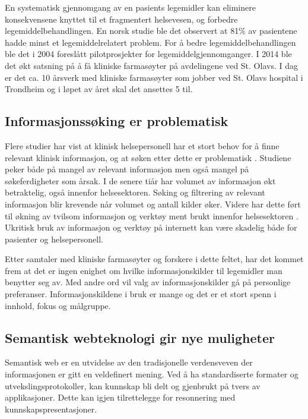 En systematisk gjennomgang av en pasients legemidler kan eliminere konsekvensene knyttet til et fragmentert helsevesen, og forbedre legemiddelbehandlingen. En norsk studie ble det observert at 81\% av pasientene hadde minst et legemiddelrelatert problem.\citep{81prosent_LRP} For å bedre legemiddelbehandlingen ble det i 2004 foreslått pilotprosjekter for legemiddelgjennomganger. \citep{Helsedirektoratet_veileder_LMG} I 2014 ble det økt satsning på å få kliniske farmasøyter på avdelingene ved St. Olavs. I dag er det ca. 10 årsverk med kliniske farmasøyter som jobber ved St. Olavs hospital i Trondheim og i løpet av året skal det ansettes 5 til.


\subsection{Informasjonssøking er problematisk}
Flere studier har vist at klinisk helsepersonell har et stort behov for å finne relevant klinisk informasjon, og at søken etter dette er problematisk \citep{Information_Needs_Information_Seeking_PHC}\citep{Information_Needs_Being_Met}\citep{IR_Patterns_Surgeons}. Studiene peker både på mangel av relevant informasjon men også mangel på søkeferdigheter som årsak. I de senere tiår har volumet av informasjon økt betraktelig, også innenfor helsesektoren. Søking og filtrering av relevant informasjon blir krevende når volumet og antall kilder øker. Videre har dette ført til økning av tvilsom informasjon og verktøy ment brukt innenfor helsesektoren \citep{Rating_Health_Information}. Ukritisk bruk av informasjon og verktøy på internett kan være skadelig både for pasienter og helsepersonell. 

Etter samtaler med kliniske farmasøyter og forskere i dette feltet, har det kommet frem at det er ingen enighet om hvilke informasjonskilder til legemidler man benytter seg av. Med andre ord vil valg av informasjonskilder gå på personlige preferanser. Informasjonskildene i bruk er mange og det er et stort spenn i innhold, fokus og målgruppe.

\subsection{Semantisk webteknologi gir nye muligheter}
Semantisk web er en utvidelse av den tradisjonelle verdensveven der informasjonen er gitt en veldefinert mening. Ved å ha standardiserte formater og utvekslingsprotokoller, kan kunnskap bli delt og gjenbrukt på tvers av applikasjoner.
Dette kan igjen tilrettelegge for resonnering med kunnskapspresentasjoner. 

